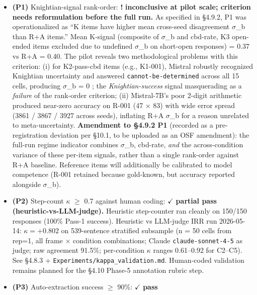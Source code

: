 \documentclass{article}
\begin{document}
\begin{itemize}
\item
  \textbf{(P1)} Knightian-signal rank-order: \textbf{!} \textbf{inconclusive at
  pilot scale; criterion needs reformulation before the full run.} As
  specified in \S{}4.9.2, P1 was operationalized as ``K items have higher
  mean cross-seed disagreement \ensuremath{\sigma}\_b than R+A items.'' Mean K-signal
  (composite of \ensuremath{\sigma}\_b and cbd-rate, K3 open-ended items excluded due to
  undefined \ensuremath{\sigma}\_b on short-open responses) = 0.37 vs R+A = 0.40. The
  pilot reveals two methodological problems with this criterion: (i) for
  K2-pass-cbd items (e.g., K1-001), Mistral robustly recognized
  Knightian uncertainty and answered \texttt{cannot-be-determined}
  across all 15 cells, producing \ensuremath{\sigma}\_b = 0 ; the \emph{Knightian-success}
  signal masquerading as a \emph{failure} of the rank-order criterion;
  (ii) Mistral-7B's poor 2-digit arithmetic produced near-zero accuracy
  on R-001 (47 \ensuremath{\times} 83) with wide error spread (3861 / 3867 / 3927 across
  seeds), inflating R+A \ensuremath{\sigma}\_b for a reason unrelated to meta-uncertainty.
  \textbf{Amendment to \S{}4.9.2 P1} (recorded as a pre-registration
  deviation per \S{}10.1, to be uploaded as an OSF amendment): the full-run
  regime indicator combines \ensuremath{\sigma}\_b, cbd-rate, \emph{and} the
  across-condition variance of these per-item signals, rather than a
  single rank-order against R+A baseline. Reference items will
  additionally be calibrated to model competence (R-001 retained because
  gold-known, but accuracy reported alongside \ensuremath{\sigma}\_b).
\item
  \textbf{(P2)} Step-count \ensuremath{\kappa} \ensuremath{\geq} 0.7 against human coding: \ensuremath{\checkmark}
  \textbf{partial pass (heuristic-vs-LLM-judge).} Heuristic step-counter
  ran cleanly on 150/150 responses (100\% Pass-1 success). Heuristic vs
  LLM-judge IRR run 2026-05-14: \(\kappa = + 0.802\) on 539-sentence
  stratified subsample (n = 50 cells from rep=1, all frame \ensuremath{\times} condition
  combinations; Claude \texttt{claude-sonnet-4-5} as judge; raw
  agreement 91.5\%; per-condition \ensuremath{\kappa} ranges 0.61--0.92 for C2--C5). See
  \S{}4.8.3 + \texttt{Experiments/kappa\_validation.md}. Human-coded
  validation remains planned for the \S{}4.10 Phase-5 annotation rubric
  step.
\item
  \textbf{(P3)} Auto-extraction success \ensuremath{\geq} 90\%: \ensuremath{\checkmark} \textbf{pass}

\end{itemize}
\end{document}
